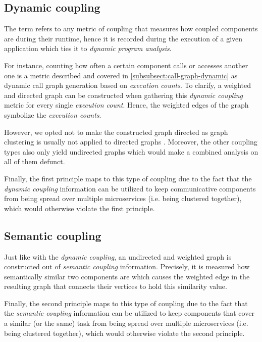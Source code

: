\documentclass[12pt,a4paper]{report}
\begin{document}
\subsection{Dynamic coupling}

The term refers to any metric of coupling that measures how coupled
components are during their runtime, hence it is recorded during the execution
of a given application which ties it to \textit{dynamic program analysis}.

For instance, counting how often a certain component calls or accesses another
one is a metric described and covered in \ref{subsubsect:call-graph-dynamic}
as dynamic call graph generation based on \textit{execution counts}.
To clarify, a weighted and directed graph can be constructed when gathering
this \textit{dynamic coupling} metric for every single \textit{execution count}.
Hence, the weighted edges of the graph symbolize the \textit{execution counts}.

However, we opted not to make the constructed graph directed as graph clustering
is usually not applied to directed graphs \cite{lancichinetti2009community}.
Moreover, the other coupling types also only yield undirected graphs which
would make a combined analysis on all of them defunct.

Finally, the first principle maps to this type of coupling due to the fact that
the \textit{dynamic coupling} information can be utilized to keep
communicative components from being spread over multiple microservices
(i.e. being clustered together), which would otherwise violate the first principle.


\subsection{Semantic coupling}

Just like with the \textit{dynamic coupling}, an undirected and weighted graph
is constructed out of \textit{semantic coupling} information.
Precisely, it is measured how semantically similar two components are which
causes the weighted edge in the resulting graph that connects their vertices
to hold this similarity value.

Finally, the second principle maps to this type of coupling due to the fact that
the \textit{semantic coupling} information can be utilized to keep
components that cover a similar (or the same) task from being spread over
multiple microservices (i.e. being clustered together),
which would otherwise violate the second principle.
\end{document}
